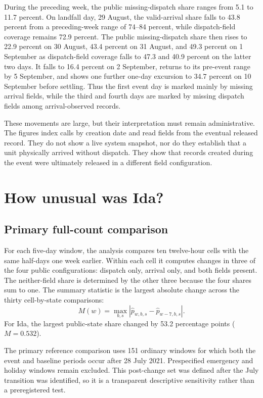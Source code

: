 \documentclass[11pt]{article}
\begin{document}
During the preceding week, the public missing-dispatch share ranges from 5.1 to 11.7 percent. On landfall day, 29 August, the valid-arrival share falls to 43.8 percent from a preceding-week range of 74--84 percent, while dispatch-field coverage remains 72.9 percent. The public missing-dispatch share then rises to 22.9 percent on 30 August, 43.4 percent on 31 August, and 49.3 percent on 1 September as dispatch-field coverage falls to 47.3 and 40.9 percent on the latter two days. It falls to 16.4 percent on 2 September, returns to its pre-event range by 5 September, and shows one further one-day excursion to 34.7 percent on 10 September before settling. Thus the first event day is marked mainly by missing arrival fields, while the third and fourth days are marked by missing dispatch fields among arrival-observed records.

These movements are large, but their interpretation must remain administrative. The figures index calls by creation date and read fields from the eventual released record. They do not show a live system snapshot, nor do they establish that a unit physically arrived without dispatch. They show that records created during the event were ultimately released in a different field configuration.

\section{How unusual was Ida?}

\subsection{Primary full-count comparison}

For each five-day window, the analysis compares ten twelve-hour cells with the same half-days one week earlier. Within each cell it computes changes in three of the four public configurations: dispatch only, arrival only, and both fields present. The neither-field share is determined by the other three because the four shares sum to one. The summary statistic is the largest absolute change across the thirty cell-by-state comparisons:
\begin{equation}
M(w)=\max_{b,s}\left|\widehat p_{w,b,s}-\widehat p_{w-7,b,s}\right|.
\end{equation}
For Ida, the largest public-state share changed by 53.2 percentage points ($M=0.532$).

The primary reference comparison uses 151 ordinary windows for which both the event and baseline periods occur after 28 July 2021. Prespecified emergency and holiday windows remain excluded. This post-change set was defined after the July transition was identified, so it is a transparent descriptive sensitivity rather than a preregistered test.
\end{document}
